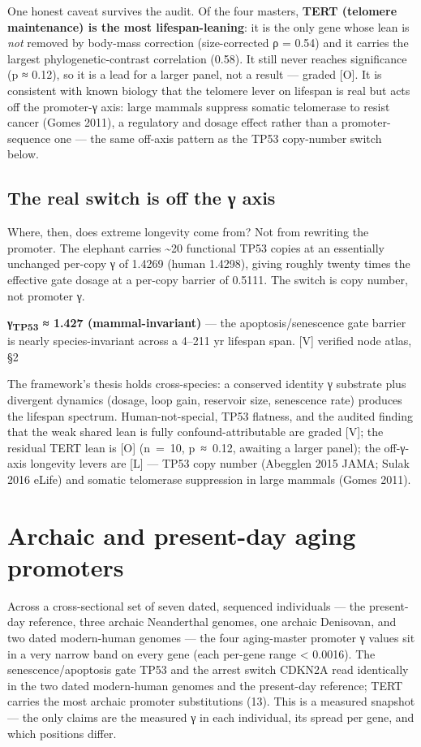 \documentclass[11pt]{article}
\begin{document}
One honest caveat survives the audit. Of the four masters, \textbf{TERT (telomere maintenance) is the most lifespan-leaning}: it is the only gene whose lean is \textit{not} removed by body-mass correction (size-corrected ρ = 0.54) and it carries the largest phylogenetic-contrast correlation (0.58). It still never reaches significance (p ≈ 0.12), so it is a lead for a larger panel, not a result — graded [O]. It is consistent with known biology that the telomere lever on lifespan is real but acts off the promoter-γ axis: large mammals suppress somatic telomerase to resist cancer (Gomes 2011), a regulatory and dosage effect rather than a promoter-sequence one — the same off-axis pattern as the TP53 copy-number switch below.

\subsection*{The real switch is off the γ axis}

Where, then, does extreme longevity come from? Not from rewriting the promoter. The elephant carries \textasciitilde{}20 functional TP53 copies at an essentially unchanged per-copy γ of 1.4269 (human 1.4298), giving roughly twenty times the effective gate dosage at a per-copy barrier of 0.5111. The switch is copy number, not promoter γ.

\begin{vpbox}\textbf{γ\textsubscript{TP53} ≈ 1.427 (mammal-invariant)} — the apoptosis/senescence gate barrier is nearly species-invariant across a 4–211 yr lifespan span. [V] verified node atlas, §2\end{vpbox}

The framework's thesis holds cross-species: a conserved identity γ substrate plus divergent dynamics (dosage, loop gain, reservoir size, senescence rate) produces the lifespan spectrum. Human-not-special, TP53 flatness, and the audited finding that the weak shared lean is fully confound-attributable are graded [V]; the residual TERT lean is [O] (n = 10, p ≈ 0.12, awaiting a larger panel); the off-γ-axis longevity levers are [L] — TP53 copy number (Abegglen 2015 JAMA; Sulak 2016 eLife) and somatic telomerase suppression in large mammals (Gomes 2011).

\section{Archaic and present-day aging promoters}

\begin{answerbox}Across a cross-sectional set of seven dated, sequenced individuals — the present-day reference, three archaic Neanderthal genomes, one archaic Denisovan, and two dated modern-human genomes — the four aging-master promoter γ values sit in a very narrow band on every gene (each per-gene range < 0.0016). The senescence/apoptosis gate TP53 and the arrest switch CDKN2A read identically in the two dated modern-human genomes and the present-day reference; TERT carries the most archaic promoter substitutions (13). This is a measured snapshot — the only claims are the measured γ in each individual, its spread per gene, and which positions differ.\end{answerbox}
\end{document}
